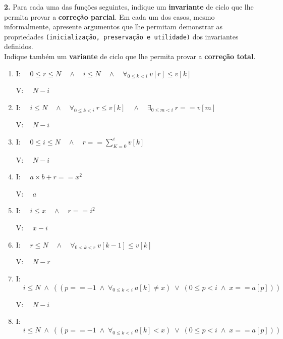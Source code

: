 \documentclass{article}
\begin{document}
\noindent \textbf{2.} Para cada uma das funções seguintes, indique um \textbf{invariante} de ciclo que lhe permita provar a \textbf{correção parcial}. Em cada um dos casos, mesmo informalmente, apresente argumentos que lhe permitam demonstrar as propriedades \texttt{(inicialização, preservação e utilidade)} dos invariantes definidos.\\

\noindent Indique também um \textbf{variante} de ciclo que lhe permita provar a \textbf{correção total}.

\begin{enumerate}[label=\alph*)]
    \item I: $ \quad 0 \leq r \leq N \quad \land \quad i \leq N \quad \land \quad \forall_{0 \le k < i} \  v[r] \leq v[k] $
    
    V: $ \quad N - i $
    
    \item I: $ \quad i \leq N \quad \land \quad \forall_{0 \leq k < i} \  r \leq v[k] \quad \land \quad \exists_{0 \leq m < i} \  r == v[m] $
    
    V: $ \quad N - i $
    
    \item I: $ \quad 0 \leq i \leq N \quad \land \quad r == \sum_{K = 0}^{i} v[k] $
    
    V: $ \quad N - i $
    
    \item I: $ \quad a \times b + r == x^2 $
    
    V: $ \quad a $
    
    \item I: $ \quad i \leq x \quad \land \quad r == i^2 $
    
    V: $ \quad x - i $
    
    \item I: $ \quad r \leq N \quad \land \quad \forall_{0 < k < r} \  v[k-1] \leq v[k] $
    
    V: $ \quad N - r $
    
    \item I: $ \quad i \leq N \; \land \; ((p == -1 \; \land \; \forall_{0 \le k < i} \  a[k] \neq x) \; \lor \; (0 \leq p < i \; \land \; x == a[p])) $
    
    V: $ \quad N - i $
    
    \item I: $ \quad i \leq N \; \land \; ((p == -1 \; \land \; \forall_{0 \le k < i} \  a[k] < x) \; \lor \; (0 \leq p < i \; \land \; x == a[p])) $
    

\end{enumerate}
\end{document}
